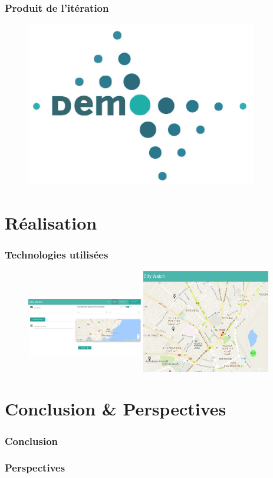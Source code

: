 \documentclass{beamer}
\begin{document}
\begin{frame}
    \frametitle{Produit de l'itération}
    \begin{figure}
        \includegraphics[width=0.9\textwidth]{./figures/demo}
    \end{figure}
\end{frame}

\section{Réalisation}

\begin{frame}
\frametitle{Technologies utilisées}
\end{frame}
\begin{frame}
    \begin{center}
    \begin{figure}
        \includegraphics[width=0.45\textwidth,height=4cm]{./figures/sprint2-rapport-screenshot1}
        \includegraphics[width=0.5\textwidth]{./figures/sprint2-dashboard-screenshot2}
    \end{figure}
    \end{center}
\end{frame}

\section{Conclusion \& Perspectives}
\begin{frame}
    \frametitle{Conclusion}
\end{frame}

\begin{frame}
    \frametitle{Perspectives}
\end{frame}
\end{document}
